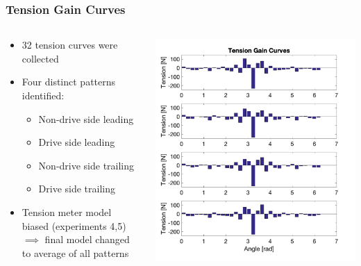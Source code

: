 \documentclass[mathserif]{beamer}
\begin{document}
\begin{frame}
\frametitle{Tension Gain Curves}
\begin{columns}[T] 
    \begin{column}[T]{5.25cm} 
        \begin{itemize}
        \item 32 tension curves were collected
        \item Four distinct patterns identified:
        	\begin{itemize}
            \item Non-drive side leading
            \item Drive side leading
            \item Non-drive side trailing
            \item Drive side trailing
	\end{itemize}
	\item Tension meter model biased (experiments 4,5) $\implies$ final model changed to average of all patterns
        \end{itemize}
     \end{column}
     \begin{column}[T]{5cm} %
          \includegraphics[totalheight=6cm]{TensionGC}
     \end{column}
 \end{columns}
\end{frame}
\end{document}
